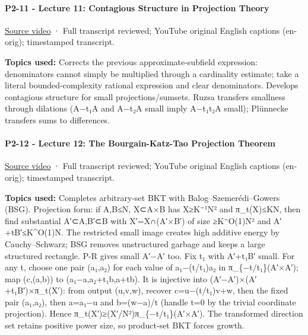 \paragraph{P2-11 - Lecture 11: Contagious Structure in Projection Theory}\label{p2-11---lecture-11-contagious-structure-in-projection-theory}

\href{https://www.youtube.com/watch?v=Uz7aJtbfqkU}{Source video} · Full transcript reviewed; YouTube original English captions (en-orig); timestamped transcript.

\textbf{Topics used:} Corrects the previous approximate-subfield expression: denominators cannot simply be multiplied through a cardinality estimate; take a literal bounded-complexity rational expression and clear denominators. Develops contagious structure for small projections/sumsets. Ruzsa transfers smallness through dilations (A−t₁A and A−t₂A small imply A−t₁t₂A small); Plünnecke transfers sums to differences.

\paragraph{P2-12 - Lecture 12: The Bourgain-Katz-Tao Projection Theorem}\label{p2-12---lecture-12-the-bourgain-katz-tao-projection-theorem}

\href{https://www.youtube.com/watch?v=aHQxdnufLbg}{Source video} · Full transcript reviewed; YouTube original English captions (en-orig); timestamped transcript.

\textbf{Topics used:} Completes arbitrary-set BKT with Balog--Szemerédi--Gowers (BSG). Projection form: if \textbar A\textbar,\textbar B\textbar≤N, X⊂A×B has \textbar X\textbar≥K⁻¹N² and \textbar π\_t(X)\textbar≤KN, then find substantial A′⊂A,B′⊂B with X′=X∩(A′×B′) of size ≥K⁻O(1)N² and \textbar A′+tB′\textbar≤K\^{}O(1)N. The restricted small image creates high additive energy by Cauchy--Schwarz; BSG removes unstructured garbage and keeps a large structured rectangle. P-R gives small A′−A′ too. Fix t₁ with A′+t₁B′ small. For any t, choose one pair (a₁,a₂) for each value of a₁−(t/t₁)a₂ in π\_\{−t/t₁\}(A′×A′); map (c,(a,b)) to (a₁−a,a₂+t₁b,a+tb). It is injective into (A′−A′)×(A′+t₁B′)×π\_t(X′): from output (u,v,w), recover c=u−(t/t₁)v+w, then the fixed pair (a₁,a₂), then a=a₁−u and b=(w−a)/t (handle t=0 by the trivial coordinate projection). Hence \textbar π\_t(X′)\textbar≥(\textbar X′\textbar/N²)\textbar π\_\{−t/t₁\}(A′×A′)\textbar. The transformed direction set retains positive power size, so product-set BKT forces growth.

